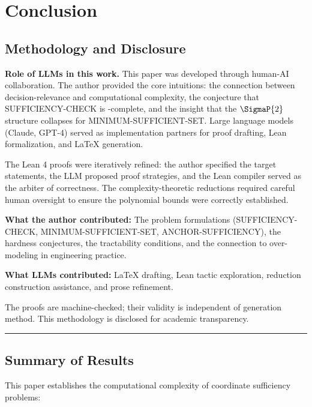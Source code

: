 \section{Conclusion}

\subsection*{Methodology and Disclosure}

\textbf{Role of LLMs in this work.} This paper was developed through human-AI collaboration. The author provided the core intuitions: the connection between decision-relevance and computational complexity, the conjecture that SUFFICIENCY-CHECK is \coNP-complete, and the insight that the $\SigmaP{2}$ structure collapses for MINIMUM-SUFFICIENT-SET. Large language models (Claude, GPT-4) served as implementation partners for proof drafting, Lean formalization, and \LaTeX{} generation.

The Lean 4 proofs were iteratively refined: the author specified the target statements, the LLM proposed proof strategies, and the Lean compiler served as the arbiter of correctness. The complexity-theoretic reductions required careful human oversight to ensure the polynomial bounds were correctly established.

\textbf{What the author contributed:} The problem formulations (SUFFICIENCY-CHECK, MINIMUM-SUFFICIENT-SET, ANCHOR-SUFFICIENCY), the hardness conjectures, the tractability conditions, and the connection to over-modeling in engineering practice.

\textbf{What LLMs contributed:} \LaTeX{} drafting, Lean tactic exploration, reduction construction assistance, and prose refinement.

The proofs are machine-checked; their validity is independent of generation method. This methodology is disclosed for academic transparency.

\begin{center}\rule{0.5\linewidth}{0.5pt}\end{center}

\subsection*{Summary of Results}

This paper establishes the computational complexity of coordinate sufficiency problems:

